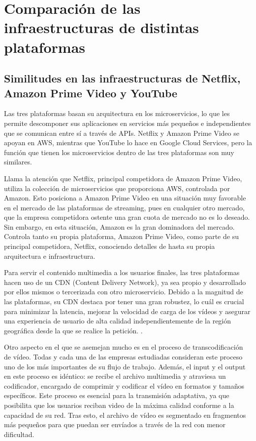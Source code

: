\documentclass[12pt,a4paper]{article}
\begin{document}
    \newpage

\section{Comparación de las infraestructuras de distintas plataformas}

\subsection{Similitudes en las infraestructuras de Netflix, Amazon Prime Video y YouTube}

Las tres plataformas basan su arquitectura en los microservicios, lo que les permite descomponer sus aplicaciones en servicios más pequeños e independientes que se comunican entre sí a través de APIs. Netflix y Amazon Prime Video se apoyan en AWS, mientras que YouTube lo hace en Google Cloud Services, pero la función que tienen los microservicios dentro de las tres plataformas son muy similares.

Llama la atención que Netflix, principal competidora de Amazon Prime Video, utiliza la colección de microservicios que proporciona AWS, controlada por Amazon. Esto posiciona a Amazon Prime Video en una situación muy favorable en el mercado de las plataformas de streaming, pues en cualquier otro mercado, que la empresa competidora ostente una gran cuota de mercado no es lo deseado. Sin embargo, en esta situación, Amazon es la gran dominadora del mercado. Controla tanto su propia plataforma, Amazon Prime Video, como parte de su principal competidora, Netflix, conociendo detalles de hasta su propia arquitectura e infraestructura.

Para servir el contenido multimedia a los usuarios finales, las tres plataformas hacen uso de un CDN (Content Delivery Network), ya sea propio y desarrollado por ellos mismos o tercerizada con otro microservicio. Debido a la magnitud de las plataformas, su CDN destaca por tener una gran robustez, lo cuál es crucial para minimizar la latencia, mejorar la velocidad de carga de los vídeos y asegurar una experiencia de usuario de alta calidad independientemente de la región geográfica desde la que se realice la petición. \cite{song2021}.

Otro aspecto en el que se asemejan mucho es en el proceso de transcodificación de vídeo. Todas y cada una de las empresas estudiadas consideran este proceso uno de los más importantes de su flujo de trabajo. Además, el input y el output en este proceso es idéntico: se recibe el archivo multimedia y atraviesa un codificador, encargado de comprimir y codificar el vídeo en formatos y tamaños específicos. Este proceso es esencial para la transmisión adaptativa, ya que posibilita que los usuarios reciban video de la máxima calidad conforme a la capacidad de su red. Tras esto, el archivo de vídeo es segmentado en fragmentos más pequeños para que puedan ser envíados a través de la red con menor dificultad.
\end{document}
